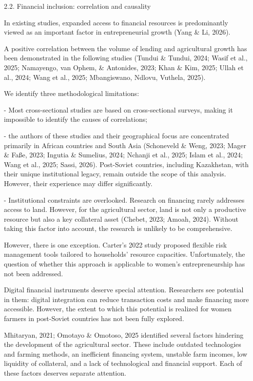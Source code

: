 \documentclass[
]{article}
\begin{document}
2.2. Financial inclusion: correlation and causality

In existing studies, expanded access to financial resources is
predominantly viewed as an important factor in entrepreneurial growth
(Yang \& Li, 2026).

A positive correlation between the volume of lending and agricultural
growth has been demonstrated in the following studies (Tundui \& Tundui,
2024; Wasif et al., 2025; Namayengo, van Ophem, \& Antonides, 2023; Khan
\& Kim, 2025; Ullah et al., 2024; Wang et al., 2025; Mbangiswano,
Ndlovu, Vuthela, 2025).

We identify three methodological limitations:

- Most cross-sectional studies are based on cross-sectional surveys,
making it impossible to identify the causes of correlations;

- the authors of these studies and their geographical focus are
concentrated primarily in African countries and South Asia (Schoneveld
\& Weng, 2023; Mager \& Faße, 2023; Ingutia \& Sumelius, 2024; Nchanji
et al., 2025; Islam et al., 2024; Wang et al., 2025; Sassi, 2026).
Post-Soviet countries, including Kazakhstan, with their unique
institutional legacy, remain outside the scope of this analysis.
However, their experience may differ significantly.

- Institutional constraints are overlooked. Research on financing rarely
addresses access to land. However, for the agricultural sector, land is
not only a productive resource but also a key collateral asset (Chebet,
2023; Amoah, 2024). Without taking this factor into account, the
research is unlikely to be comprehensive.

However, there is one exception. Carter's 2022 study proposed flexible
risk management tools tailored to households' resource capacities.
Unfortunately, the question of whether this approach is applicable to
women's entrepreneurship has not been addressed.

Digital financial instruments deserve special attention. Researchers see
potential in them: digital integration can reduce transaction costs and
make financing more accessible. However, the extent to which this
potential is realized for women farmers in post-Soviet countries has not
been fully explored.

Mhitaryan, 2021; Omotayo \& Omotoso, 2025 identified several factors
hindering the development of the agricultural sector. These include
outdated technologies and farming methods, an inefficient financing
system, unstable farm incomes, low liquidity of collateral, and a lack
of technological and financial support. Each of these factors deserves
separate attention.
\end{document}
